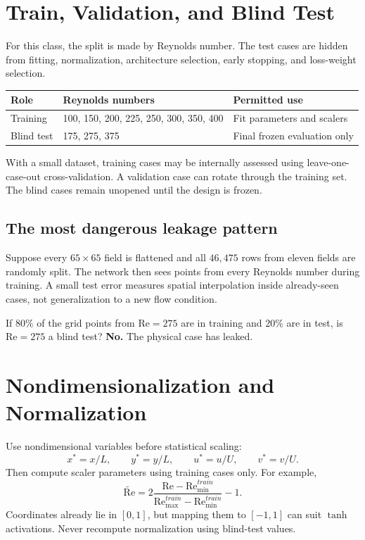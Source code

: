 \documentclass[11pt]{article}
\newcommand{\Rey}{\mathrm{Re}}
\begin{document}
\section{Train, Validation, and Blind Test}
For this class, the split is made by Reynolds number. The test cases are hidden from fitting, normalization, architecture selection, early stopping, and loss-weight selection.
\begin{center}
\begin{tabular}{lll}
\toprule
Role & Reynolds numbers & Permitted use\\
\midrule
Training & 100, 150, 200, 225, 250, 300, 350, 400 & Fit parameters and scalers\\
Blind test & 175, 275, 375 & Final frozen evaluation only\\
\bottomrule
\end{tabular}
\end{center}

With a small dataset, training cases may be internally assessed using leave-one-case-out cross-validation. A validation case can rotate through the training set. The blind cases remain unopened until the design is frozen.

\subsection{The most dangerous leakage pattern}
Suppose every $65\times65$ field is flattened and all $46{,}475$ rows from eleven fields are randomly split. The network then sees points from every Reynolds number during training. A small test error measures spatial interpolation inside already-seen cases, not generalization to a new flow condition.

\begin{selfcheck}
If $80\%$ of the grid points from $\Rey=275$ are in training and $20\%$ are in test, is $\Rey=275$ a blind test? \textbf{No.} The physical case has leaked.
\end{selfcheck}

\section{Nondimensionalization and Normalization}
Use nondimensional variables before statistical scaling:
\begin{equation}
x^*=x/L,\qquad y^*=y/L,\qquad u^*=u/U,\qquad v^*=v/U.
\end{equation}
Then compute scaler parameters using training cases only. For example,
\begin{equation}
\widetilde{\Rey}=2\frac{\Rey-\Rey_{\min}^{train}}{\Rey_{\max}^{train}-\Rey_{\min}^{train}}-1.
\end{equation}
Coordinates already lie in $[0,1]$, but mapping them to $[-1,1]$ can suit $\tanh$ activations. Never recompute normalization using blind-test values.
\end{document}
